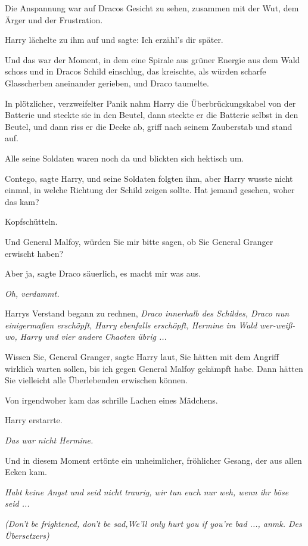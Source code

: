 Die Anspannung war auf Dracos Gesicht zu sehen, zusammen mit der Wut, dem Ärger
und der Frustration.

Harry lächelte zu ihm auf und sagte: \glqq{}Ich erzähl's dir später.\grqq{}

Und das war der Moment, in dem eine Spirale aus grüner Energie aus dem Wald
schoss und in Dracos Schild einschlug, das kreischte, als würden scharfe
Glasscherben aneinander gerieben, und Draco taumelte.

In plötzlicher, verzweifelter Panik nahm Harry die Überbrückungskabel von der
Batterie und steckte sie in den Beutel, dann steckte er die Batterie selbst in
den Beutel, und dann riss er die Decke ab, griff nach seinem Zauberstab und
stand auf.

Alle seine Soldaten waren noch da und blickten sich hektisch um.

\glqq{}Contego\grqq{}, sagte Harry, und seine Soldaten folgten ihm, aber Harry
wusste nicht einmal, in welche Richtung der Schild zeigen sollte. \glqq{}Hat
jemand gesehen, woher das kam?\grqq{}

Kopfschütteln.

\glqq{}Und General Malfoy, würden Sie mir bitte sagen, ob Sie General Granger
erwischt haben?\grqq{}

\glqq{}Aber ja\grqq{}, sagte Draco säuerlich, \glqq{}es macht mir was
aus.\grqq{}

\emph{Oh, verdammt.}

Harrys Verstand begann zu rechnen, \emph{Draco innerhalb des Schildes, Draco nun
einigermaßen erschöpft, Harry ebenfalls erschöpft, Hermine im Wald wer-weiß-wo,
Harry und vier andere Chaoten übrig ...}

\glqq{}Wissen Sie, General Granger\grqq{}, sagte Harry laut, \glqq{}Sie hätten
mit dem Angriff wirklich warten sollen, bis ich gegen General Malfoy gekämpft
habe. Dann hätten Sie vielleicht alle Überlebenden erwischen können.\grqq{}

Von irgendwoher kam das schrille Lachen eines Mädchens.

Harry erstarrte.

\emph{Das war nicht Hermine.}

Und in diesem Moment ertönte ein unheimlicher, fröhlicher Gesang, der aus allen
Ecken kam.

\emph{\glqq{}Habt keine Angst und seid nicht traurig, wir tun euch nur weh, wenn
ihr böse seid ...\grqq{}}

\emph{(Don't be frightened, don't be sad,We'll only hurt you if you're bad ...,
anmk. Des Übersetzers)}

